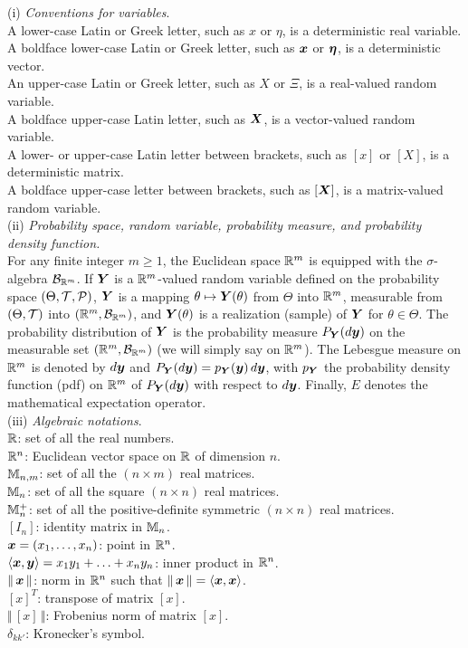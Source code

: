 \noindent (i) {\textit{Conventions for variables}}.\\
A lower-case Latin or Greek letter, such as $x$ or $\eta$, is a deterministic real variable.\\
A boldface lower-case Latin or Greek letter, such as $\boldsymbol{x}$ or ${\boldsymbol{\eta}}$, is a deterministic vector.\\
An upper-case Latin or Greek letter, such as $X$ or $\Xi$, is a real-valued random variable.\\
A boldface upper-case Latin letter, such as $\boldsymbol{X}$, is a vector-valued random variable.\\
A lower- or upper-case Latin letter between brackets, such as $[x]$ or $[X]$, is a deterministic matrix.\\
A boldface upper-case letter between brackets, such as $[\boldsymbol{X}]$, is a matrix-valued random variable.\\

\noindent (ii) {\textit{Probability space, random variable, probability measure, and probability density function.}}\\
For any finite integer $m\geq 1$, the Euclidean space ${\mathbb{R}}^m$ is equipped with the $\sigma$-algebra ${\mathcal{B}}_{{\mathbb{R}}^m}$.
If $\boldsymbol{Y}$ is a ${\mathbb{R}}^m$-valued random variable defined on the probability space $(\Theta,{\mathcal{T}},{\mathcal{P}})$, $\boldsymbol{Y}$ is a  mapping $\theta\mapsto\boldsymbol{Y}(\theta)$ from $\Theta$ into ${\mathbb{R}}^m$, measurable from $(\Theta,{\mathcal{T}})$ into $({\mathbb{R}}^m,{\mathcal{B}}_{{\mathbb{R}}^m})$,
and $\boldsymbol{Y}(\theta)$ is a realization (sample) of $\boldsymbol{Y}$ for $\theta\in\Theta$. 
The probability distribution of $\boldsymbol{Y}$ is the probability measure $P_{\boldsymbol{Y}}(d\boldsymbol{y})$ on the measurable set $({\mathbb{R}}^m,{\mathcal{B}}_{{\mathbb{R}}^m})$ (we will simply say on ${\mathbb{R}}^m$). 
The Lebesgue measure on ${\mathbb{R}}^m$ is denoted by $d\boldsymbol{y}$ and $P_{\boldsymbol{Y}}(d\boldsymbol{y}) = p_{\boldsymbol{Y}}(\boldsymbol{y})\, d\boldsymbol{y}$, with $p_{\boldsymbol{Y}}$ the probability density function (pdf) on ${\mathbb{R}}^m$ of $P_{\boldsymbol{Y}}(d\boldsymbol{y})$ with respect to $d\boldsymbol{y}$.
Finally, $E$ denotes the mathematical expectation operator.\\

\noindent (iii) {\textit{Algebraic notations}}.\\
${\mathbb{R}}$: set of all the real numbers.\\
${\mathbb{R}}^n$: Euclidean vector space on ${\mathbb{R}}$ of dimension $n$.\\
${\mathbb{M}}_{n,m}$: set of all the $(n\times m)$ real matrices.\\
${\mathbb{M}}_n$: set of all the square $(n\times n)$ real matrices.\\
${\mathbb{M}}_n^+$: set of all the positive-definite symmetric $(n\times n)$ real matrices.\\
$[I_{n}]$: identity matrix in ${\mathbb{M}}_n$.\\
$\boldsymbol{x} = (x_1,\ldots,x_n)$: point in ${\mathbb{R}}^n$.\\
$\langle \boldsymbol{x},\boldsymbol{y} \rangle = x_1 y_1 + \ldots + x_n y_n$: inner product in ${\mathbb{R}}^n$.\\
$\Vert\,\boldsymbol{x}\,\Vert$:  norm in ${\mathbb{R}}^n$ such that $\Vert\,\boldsymbol{x}\,\Vert = \langle \boldsymbol{x},\boldsymbol{x} \rangle$.\\
$[x]^T$: transpose of matrix $[x]$.\\
$\Vert\, [x]\, \Vert$: Frobenius norm of matrix  $[x]$.\\
$\delta_{kk'}$: Kronecker's symbol.

